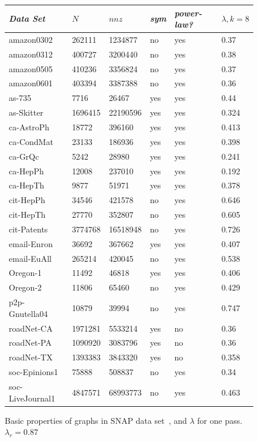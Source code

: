 \documentclass[11pt]{article}
\begin{document}
\begin{figure}
\caption{Basic properties of graphs in SNAP data set~\cite{Leskovec-data}, and $\lambda$ for one pass. $\lambda_r=0.87$}
\centering
{ \begin{tabular}{ *6l }    \toprule
\emph{Data Set} & $N$ & $nnz$ & \emph{sym} & \emph{power-law?} & $\lambda, k=8$ \\\midrule 
amazon0302 & 262111 & 1234877 & no & yes & 0.37\\ 
amazon0312 & 400727 & 3200440 & no & yes & 0.38\\ 
amazon0505 & 410236 & 3356824 & no & yes & 0.37\\ 
amazon0601 & 403394 & 3387388 & no & yes & 0.36\\ 
as-735 & 7716 & 26467 & yes & yes & 0.44\\ 
as-Skitter & 1696415 & 22190596 & yes & yes & 0.324\\ 
ca-AstroPh & 18772 & 396160 & yes & yes & 0.413\\ 
ca-CondMat & 23133 & 186936 & yes & yes & 0.398\\ 
ca-GrQc & 5242 & 28980 & yes & yes & 0.241\\ 
ca-HepPh & 12008 & 237010 & yes & yes & 0.192\\ 
ca-HepTh & 9877 & 51971 & yes & yes & 0.378\\ 
cit-HepPh & 34546 & 421578 & no & yes & 0.646\\ 
cit-HepTh & 27770 & 352807 & no & yes & 0.605\\ 
cit-Patents & 3774768 & 16518948 & no & yes & 0.726\\ 
email-Enron & 36692 & 367662 & yes & yes & 0.407\\ 
email-EuAll & 265214 & 420045 & no & yes & 0.538\\ 
Oregon-1 & 11492 & 46818 & yes & yes & 0.406\\ 
Oregon-2 & 11806 & 65460 & no & yes & 0.429\\ 
p2p-Gnutella04 & 10879 & 39994 & no & yes & 0.747\\ 
roadNet-CA & 1971281 & 5533214 & yes & no & 0.36\\ 
roadNet-PA & 1090920 & 3083796 & yes & no & 0.36\\ 
roadNet-TX & 1393383 & 3843320 & yes & no & 0.358\\ 
soc-Epinions1 & 75888 & 508837 & no & yes & 0.34\\ 
soc-LiveJournal1 & 4847571 & 68993773 & no & yes & 0.463\\ 

\end{tabular}}
\end{figure}
\end{document}

